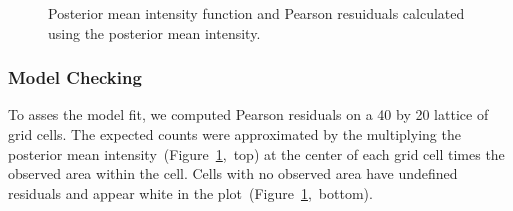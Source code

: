 \documentclass[]{interact}
\begin{document}
\begin{figure}[p]


\caption{Posterior mean intensity function and Pearson resuiduals calculated
using the posterior mean intensity.}
\label{effortintensity}
\end{figure}


\subsubsection{Model Checking}
\label{effortresid}

To asses the model fit, we computed Pearson residuals on a 40 by 20 lattice of
grid cells. The expected counts were approximated by the multiplying the
posterior mean intensity~(Figure~\ref{effortintensity},~top) at the center of
each grid cell times the observed area within the cell. Cells with no observed
area have undefined residuals and appear white in the
plot~(Figure~\ref{effortintensity},~bottom).
\end{document}
